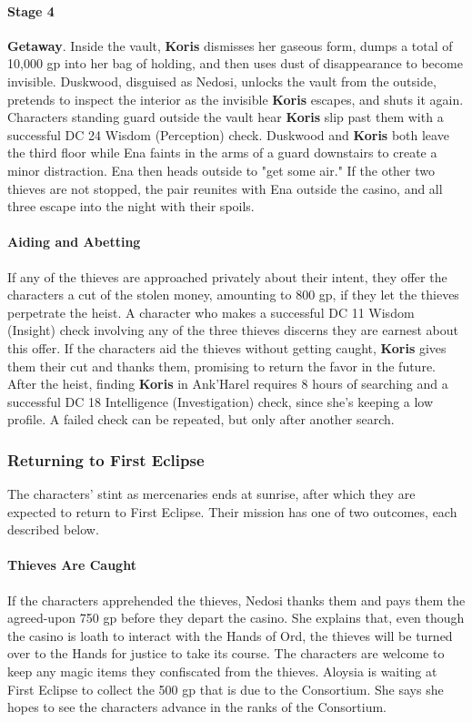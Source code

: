 \documentclass[10pt,a4,twoside,twocolumn,openany,nodeprecatedcode]{dndbook}
\begin{document}
\paragraph{Stage 4}
\textbf{Getaway}. Inside the vault, \textbf{Koris} dismisses her gaseous form, dumps a total of 10,000 gp into her bag of holding, and then uses dust of disappearance to become invisible. Duskwood, disguised as Nedosi, unlocks the vault from the outside, pretends to inspect the interior as the invisible \textbf{Koris} escapes, and shuts it again. Characters standing guard outside the vault hear \textbf{Koris} slip past them with a successful DC 24 Wisdom (Perception) check. Duskwood and \textbf{Koris} both leave the third floor while Ena faints in the arms of a guard downstairs to create a minor distraction. Ena then heads outside to "get some air." If the other two thieves are not stopped, the pair reunites with Ena outside the casino, and all three escape into the night with their spoils.
\paragraph{Aiding and Abetting}
If any of the thieves are approached privately about their intent, they offer the characters a cut of the stolen money, amounting to 800 gp, if they let the thieves perpetrate the heist. A character who makes a successful DC 11 Wisdom (Insight) check involving any of the three thieves discerns they are earnest about this offer.
If the characters aid the thieves without getting caught, \textbf{Koris} gives them their cut and thanks them, promising to return the favor in the future. After the heist, finding \textbf{Koris} in Ank'Harel requires 8 hours of searching and a successful DC 18 Intelligence (Investigation) check, since she's keeping a low profile. A failed check can be repeated, but only after another search.
\subsubsection{Returning to First Eclipse}
The characters' stint as mercenaries ends at sunrise, after which they are expected to return to First Eclipse. Their mission has one of two outcomes, each described below.
\paragraph{Thieves Are Caught}
If the characters apprehended the thieves, Nedosi thanks them and pays them the agreed-upon 750 gp before they depart the casino. She explains that, even though the casino is loath to interact with the Hands of Ord, the thieves will be turned over to the Hands for justice to take its course. The characters are welcome to keep any magic items they confiscated from the thieves.
Aloysia is waiting at First Eclipse to collect the 500 gp that is due to the Consortium. She says she hopes to see the characters advance in the ranks of the Consortium.
\end{document}
